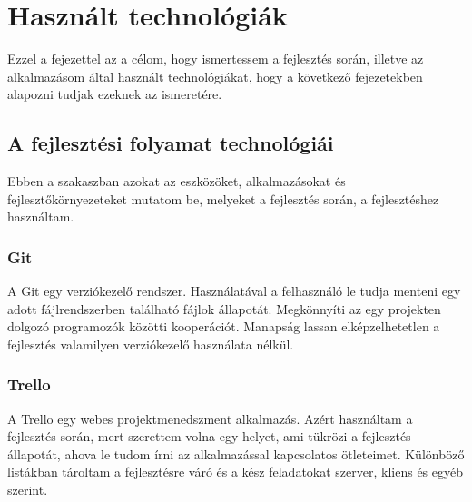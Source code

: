 \chapter{Használt technológiák}
\label{chapt:birdmap-technologies}
Ezzel a fejezettel az a célom, hogy ismertessem a fejlesztés során, illetve az alkalmazásom által használt technológiákat,
hogy a következő fejezetekben alapozni tudjak ezeknek az ismeretére.

\section{A fejlesztési folyamat technológiái}
Ebben a szakaszban azokat az eszközöket, alkalmazásokat és fejlesztőkörnyezeteket mutatom be, melyeket a fejlesztés során, a fejlesztéshez használtam. 

\subsection{Git}
A Git \cite{git} egy verziókezelő rendszer. Használatával a felhasználó le tudja menteni egy adott fájlrendszerben található fájlok állapotát.
Megkönnyíti az egy projekten dolgozó programozók közötti kooperációt. Manapság lassan elképzelhetetlen a fejlesztés valamilyen verziókezelő használata nélkül.

\subsection{Trello}
A Trello \cite{trello} egy webes projektmenedszment alkalmazás. 
Azért használtam a fejlesztés során, mert szerettem volna egy helyet, ami tükrözi a fejlesztés állapotát, ahova le tudom írni az alkalmazással kapcsolatos ötleteimet.
Különböző listákban tároltam a fejlesztésre váró és a kész feladatokat szerver, kliens és egyéb szerint.

